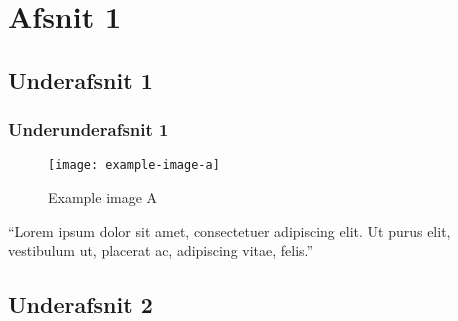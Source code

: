 \section{Afsnit 1}
\subsection{Underafsnit 1}
\subsubsection{Underunderafsnit 1}
\lipsum[66]

\begin{figure}[!ht]
\centering
\texttt{[image: example-image-a]}
\caption{Example image A}
\end{figure}

"`Lorem ipsum dolor sit amet, consectetuer adipiscing elit. Ut purus elit, vestibulum ut, placerat ac, adipiscing vitae, felis."' \citep{lipsum2014book}

\subsection{Underafsnit 2}
\lipsum[1]